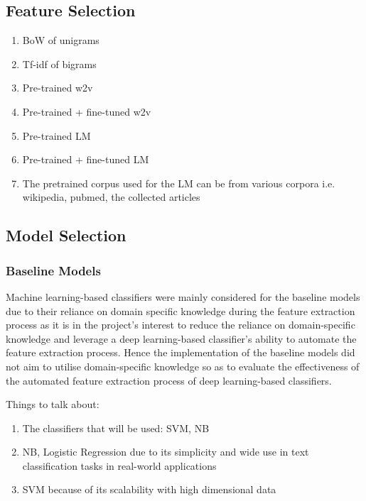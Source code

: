 \documentclass[a4paper,twoside,phd]{BYUPhys}
\begin{document}
\subsection{Feature Selection}
\label{sec:ModelFeatureSelection}

\begin{enumerate}
	\item BoW of unigrams
	\item Tf-idf of bigrams
	\item Pre-trained w2v
	\item Pre-trained + fine-tuned w2v
	\item Pre-trained LM
	\item Pre-trained + fine-tuned LM
		\item The pretrained corpus used for the LM can be from various corpora i.e. wikipedia, pubmed, the collected articles
\end{enumerate}

\subsection{Model Selection}
\label{sec:ModelSelection}


\subsubsection{Baseline Models}
\label{sec:BaselineModels}

Machine learning-based classifiers were mainly considered for the baseline models due to their reliance on domain specific knowledge during the feature extraction process as it is in the project's interest to reduce the reliance on domain-specific knowledge and leverage a deep learning-based classifier's ability to automate the feature extraction process. Hence the implementation of the baseline models did not aim to utilise domain-specific knowledge so as to evaluate the effectiveness of the automated feature extraction process of deep learning-based classifiers.

Things to talk about:
\begin{enumerate}
	\item The classifiers that will be used: SVM, NB
	\item NB, Logistic Regression due to its simplicity and wide use in text classification tasks in real-world applications
	\item SVM because of its scalability with high dimensional data

\end{enumerate}
\end{document}

